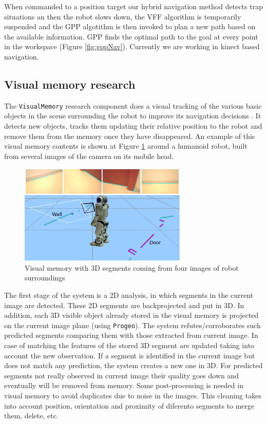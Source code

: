 \documentclass[twocolumn]{svjour3}          %
\begin{document}
When commanded to a position target our hybrid navigation method detects trap situations an then the robot slows down, the VFF algorithm is temporarily suspended and the GPP algotithm is then invoked to plan a new path based on the available information. GPP finds the optimal path to the goal at every point in the workspace (Figure \ref{fig:gppNav}). Currently we are working in kinect based navigation.

\subsection{Visual memory research}

The \texttt{VisualMemory} research component does a visual tracking of the various basic objects in the scene surrounding the robot to improve its navigation decisions \cite{canas2012}. It detects new objects, tracks them updating their relative position to the robot and remove them from the memory once they have disappeared. An example of this visual memory contents is shown at Figure \ref{fig:memory} around a humanoid robot, built from several images of the camera on its mobile head.

\begin{figure}[h!]
\includegraphics[width=8cm]{figs/experimentoReal.jpg}
\caption{Visual memory with 3D segments coming from four images of robot surroundings}
\label{fig:memory}
\end{figure}

The first stage of the system is a 2D analysis, in which segments in the current image are detected. These 2D segments are backprojected and put in 3D. In addition, each 3D visible object already stored in the visual memory is projected on the current image plane (using \texttt{Progeo}). The system refutes/corroborates such predicted segments comparing them with those extracted from current image. In case of matching the features of the stored 3D segment are updated taking into account the new observation. If a segment is identified in the current image but does not match any prediction, the system creates a new one in 3D. For predicted segments not really observed in current image their quality goes down and eventually will be removed from memory. Some post-processing is needed in visual memory to avoid duplicates due to noise in the images. This cleaning takes into account position, orientation and proximity of diferento segments to merge them, delete, etc.
\end{document}
